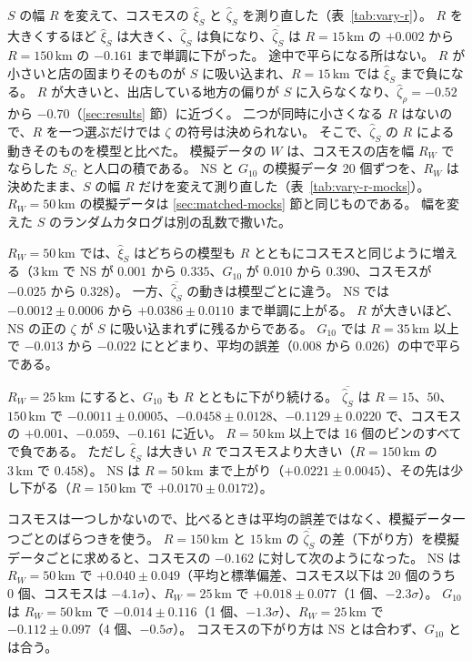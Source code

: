 \documentclass[a4paper,11pt]{ltjsarticle}
\begin{document}
$S$ の幅 $R$ を変えて、コスモスの $\hat\xi_S$ と $\hat\zeta_S$ を測り直した（表~\ref{tab:vary-r}）。
$R$ を大きくするほど $\hat\xi_S$ は大きく、$\hat\zeta_S$ は負になり、$\overline{\hat\zeta_S}$ は $R = 15\,\mathrm{km}$ の $+0.002$ から $R = 150\,\mathrm{km}$ の $-0.161$ まで単調に下がった。
途中で平らになる所はない。
$R$ が小さいと店の固まりそのものが $S$ に吸い込まれ、$R = 15\,\mathrm{km}$ では $\hat\xi_S$ まで負になる。
$R$ が大きいと、出店している地方の偏りが $S$ に入らなくなり、$\hat\zeta_\rho = -0.52$ から $-0.70$（\ref{sec:results} 節）に近づく。
二つが同時に小さくなる $R$ はないので、$R$ を一つ選ぶだけでは $\zeta$ の符号は決められない。
そこで、$\hat\zeta_S$ の $R$ による動きそのものを模型と比べた。
模擬データの $W$ は、コスモスの店を幅 $R_W$ でならした $S_{\mathrm{C}}$ と人口の積である。
NS と $G_{10}$ の模擬データ 20 個ずつを、$R_W$ は決めたまま、$S$ の幅 $R$ だけを変えて測り直した（表~\ref{tab:vary-r-mocks}）。
$R_W = 50\,\mathrm{km}$ の模擬データは \ref{sec:matched-mocks} 節と同じものである。
幅を変えた $S$ のランダムカタログは別の乱数で撒いた。

$R_W = 50\,\mathrm{km}$ では、$\hat\xi_S$ はどちらの模型も $R$ とともにコスモスと同じように増える（$3\,\mathrm{km}$ で NS が $0.001$ から $0.335$、$G_{10}$ が $0.010$ から $0.390$、コスモスが $-0.025$ から $0.328$）。
一方、$\overline{\hat\zeta_S}$ の動きは模型ごとに違う。
NS では $-0.0012 \pm 0.0006$ から $+0.0386 \pm 0.0110$ まで単調に上がる。
$R$ が大きいほど、NS の正の $\zeta$ が $S$ に吸い込まれずに残るからである。
$G_{10}$ では $R = 35\,\mathrm{km}$ 以上で $-0.013$ から $-0.022$ にとどまり、平均の誤差（$0.008$ から $0.026$）の中で平らである。

$R_W = 25\,\mathrm{km}$ にすると、$G_{10}$ も $R$ とともに下がり続ける。
$\overline{\hat\zeta_S}$ は $R = 15$、$50$、$150\,\mathrm{km}$ で $-0.0011 \pm 0.0005$、$-0.0458 \pm 0.0128$、$-0.1129 \pm 0.0220$ で、コスモスの $+0.001$、$-0.059$、$-0.161$ に近い。
$R = 50\,\mathrm{km}$ 以上では 16 個のビンのすべてで負である。
ただし $\hat\xi_S$ は大きい $R$ でコスモスより大きい（$R = 150\,\mathrm{km}$ の $3\,\mathrm{km}$ で $0.458$）。
NS は $R = 50\,\mathrm{km}$ まで上がり（$+0.0221 \pm 0.0045$）、その先は少し下がる（$R = 150\,\mathrm{km}$ で $+0.0170 \pm 0.0172$）。

コスモスは一つしかないので、比べるときは平均の誤差ではなく、模擬データ一つごとのばらつきを使う。
$R = 150\,\mathrm{km}$ と $15\,\mathrm{km}$ の $\overline{\hat\zeta_S}$ の差（下がり方）を模擬データごとに求めると、コスモスの $-0.162$ に対して次のようになった。
NS は $R_W = 50\,\mathrm{km}$ で $+0.040 \pm 0.049$（平均と標準偏差、コスモス以下は 20 個のうち 0 個、コスモスは $-4.1\sigma$）、$R_W = 25\,\mathrm{km}$ で $+0.018 \pm 0.077$（1 個、$-2.3\sigma$）。
$G_{10}$ は $R_W = 50\,\mathrm{km}$ で $-0.014 \pm 0.116$（1 個、$-1.3\sigma$）、$R_W = 25\,\mathrm{km}$ で $-0.112 \pm 0.097$（4 個、$-0.5\sigma$）。
コスモスの下がり方は NS とは合わず、$G_{10}$ とは合う。
\end{document}
